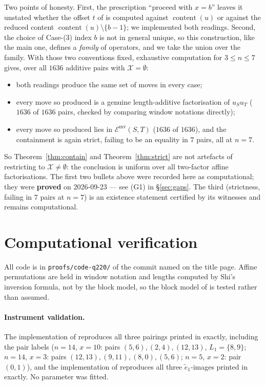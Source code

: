 \documentclass[11pt]{article}
\theoremstyle{definition}
\newcommand{\cont}{\operatorname{content}}
\newcommand{\et}{\tilde e_1}
\newcommand{\XX}{\mathcal{X}}
\newcommand{\EE}{\mathcal{E}}
\begin{document}
Two points of honesty. First, the prescription ``proceed with $x=b$'' leaves it unstated
whether the offset $t$ of \cite[Def.~\texttt{crystal operators}(i)]{MS} is computed against $\cont(u)$ or against the
reduced content $\cont(u)\setminus\{b-1\}$; we implemented both readings. Second, the choice of
Case-(3) index $b$ is not in general unique, so this construction, like the main one, defines a
\emph{family} of operators, and we take the union over the family. With those two conventions
fixed, exhaustive computation for $3\le n\le7$ gives, over all $1636$ additive pairs with
$\XX=\emptyset$:
\begin{itemize}
\item both readings produce the same set of moves in every case;
\item every move so produced is a genuine length-additive factorisation of $u_Su_T$ ($1636$ of
$1636$ pairs, checked by comparing window notations directly);
\item every move so produced lies in $\EE^{\mathrm{mv}}(S,T)$ ($1636$ of $1636$), and the
containment is again strict, failing to be an equality in $7$ pairs, all at $n=7$.
\end{itemize}
So Theorem~\ref{thm:contain} and Theorem~\ref{thm:strict} are not artefacts of restricting to
$\XX\ne\emptyset$: the conclusion is uniform over all two-factor affine factorisations. The
first two bullets above were recorded here as computational; they were \textbf{proved} on
2026-09-23 --- see (G1) in \S\ref{sec:gaps}. The third (strictness, failing in $7$ pairs at
$n=7$) is an existence statement certified by its witnesses and remains computational.

\section{Computational verification}\label{sec:verify}

All code is in \texttt{proofs/code-q220/} of the commit named on the title page. Affine
permutations are held in window notation and lengths computed by Shi's inversion formula, not
by the block model, so the block model of \cite[Lem.~2.2]{Clio2} is tested rather than assumed.

\paragraph{Instrument validation.} The implementation of \cite[\S\texttt{the crystal operators}]{MS} reproduces all
three pairings printed in \cite[Ex.~\texttt{ex:pairing}]{MS} exactly, including the pair labels
($n=14$, $x=10$: pairs $(5,6),(2,4),(12,13)$, $L_1=\{8,9\}$; $n=14$, $x=3$: pairs
$(12,13),(9,11),(8,0),(5,6)$; $n=5$, $x=2$: pair $(0,1)$), and the implementation of
\cite[Def.~\texttt{crystal operators}(i)]{MS} reproduces all three $\et$-images printed in \cite[the example following Def.~\texttt{crystal operators}]{MS}
exactly. No parameter was fitted.
\end{document}
